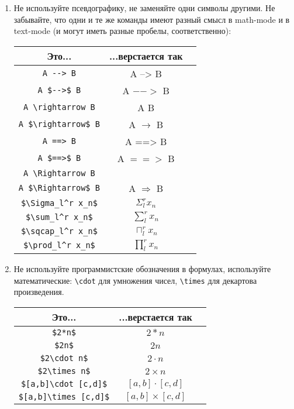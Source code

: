 \begin{enumerate}
\item 
	Не используйте псевдографику, не заменяйте одни символы другими. 
	Не забывайте, что одни и те же команды имеют разный смысл в math-mode и в text-mode (и могут иметь разные пробелы, соответственно):
	\begin{center}\begin{tabular}{|c|c|c|}
		\hline Это... & ...верстается так & \\
		\hline \verb!A --> B! & A --> B \bad \\
		\hline \verb!A $-->$ B! & A $-->$ B \bad \\
		\hline \verb!A \rightarrow B! & A \rightarrow B \bad \\
		\hline \verb!A $\rightarrow$ B! & A $\rightarrow$ B \ok \\
		\hline \verb!A ==> B! & A ==> B \bad \\
		\hline \verb!A $==>$ B! & A $==>$ B \bad \\
		\hline \verb!A \Rightarrow B! & \bad \\
		\hline \verb!A $\Rightarrow$ B! & A $\Rightarrow$ B \ok \\
		\hline \verb!$\Sigma_l^r x_n$! & $\Sigma_l^r x_n$ \bad \\
		\hline \verb!$\sum_l^r x_n$! & $\sum_l^r x_n$ \ok \\
		\hline \verb!$\sqcap_l^r x_n$! & $\sqcap_l^r x_n$ \bad \\
		\hline \verb!$\prod_l^r x_n$! & $\prod_l^r x_n$ \ok \\
		\hline
	\end{tabular}\end{center}

\item
	Не используйте программистские обозначения в формулах, используйте математические:
	\verb!\cdot! для умножения чисел, \verb!\times! для декартова произведения.
	\begin{center}\begin{tabular}{|c|c|c|}
		\hline Это... & ...верстается так & \\
		\hline \verb!$2*n$! & $2*n$ \bad \\
		\hline \verb!$2n$! & $2n$ \ok \\
		\hline \verb!$2\cdot n$! & $2\cdot n$ \ok \\
		\hline \verb!$2\times n$! & $2\times n$ \bad \\
		\hline \verb!$[a,b]\cdot [c,d]$! & $[a,b]\cdot [c,d]$ \bad \\
		\hline \verb!$[a,b]\times [c,d]$! & $[a,b]\times [c,d]$ \ok \\
		\hline
	\end{tabular}\end{center}


\end{enumerate}

